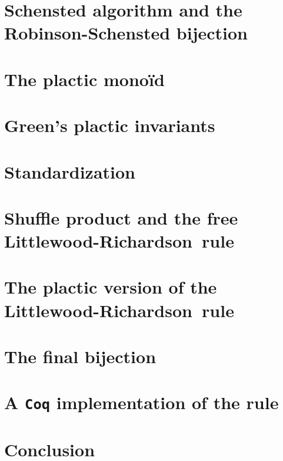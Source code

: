 \documentclass[12pt,a4paper]{article}
\newcommand{\Coq}{\texttt{Coq}\xspace}
\newcommand{\LR}{Littlewood-Richardson\ }
\begin{document}
\section{Schensted algorithm and the Robinson-Schensted bijection}

\section{The plactic monoïd}

\section{Green's plactic invariants}

\section{Standardization}

\section{Shuffle product and the free \LR rule}

\section{The plactic version of the \LR rule}

\section{The final bijection}

\section{A \Coq implementation of the rule}

\section{Conclusion}
\end{document}
